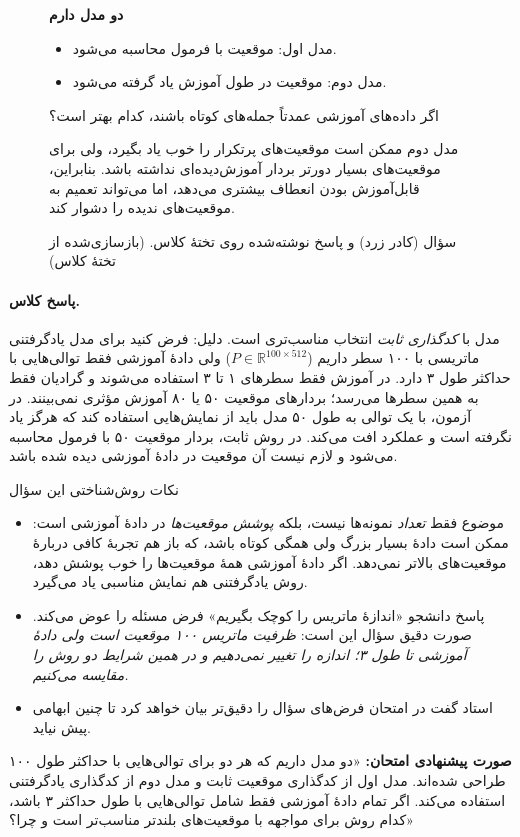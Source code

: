 \begin{figure}[htbp]
\centering
\begin{tcolorbox}[colback=softyellow,colframe=black!70,boxrule=0.8pt,arc=6pt,width=0.9\textwidth]
\textbf{دو مدل دارم}
\begin{itemize}
  \item مدل اول: موقعیت با فرمول محاسبه می‌شود.
  \item مدل دوم: موقعیت در طول آموزش یاد گرفته می‌شود.
\end{itemize}
اگر داده‌های آموزشی عمدتاً جمله‌های کوتاه باشند، کدام بهتر است؟
\end{tcolorbox}
\vspace{4pt}
\begin{tcolorbox}[colback=boxgray,colframe=black!40,boxrule=0.5pt,arc=4pt,width=0.9\textwidth]
مدل دوم ممکن است موقعیت‌های پرتکرار را خوب یاد بگیرد، ولی برای موقعیت‌های بسیار دورتر بردار آموزش‌دیده‌ای نداشته باشد. بنابراین، قابل‌آموزش بودن انعطاف بیشتری می‌دهد، اما می‌تواند تعمیم به موقعیت‌های ندیده را دشوار کند.
\end{tcolorbox}
\caption{سؤال (کادر زرد) و پاسخ نوشته‌شده روی تختهٔ کلاس. (بازسازی‌شده از تختهٔ کلاس)}
\end{figure}

\paragraph{پاسخ کلاس.} مدل با \emph{کدگذاری ثابت} انتخاب مناسب‌تری است. دلیل: فرض کنید برای مدل یادگرفتنی ماتریسی با ۱۰۰ سطر داریم ($P\in\mathbb{R}^{100\times 512}$) ولی دادهٔ آموزشی فقط توالی‌هایی با حداکثر طول ۳ دارد. در آموزش فقط سطرهای ۱ تا ۳ استفاده می‌شوند و گرادیان فقط به همین سطرها می‌رسد؛ بردارهای موقعیت ۵۰ یا ۸۰ آموزش مؤثری نمی‌بینند. در آزمون، با یک توالی به طول ۵۰ مدل باید از نمایش‌هایی استفاده کند که هرگز یاد نگرفته است و عملکرد افت می‌کند. در روش ثابت، بردار موقعیت ۵۰ با فرمول محاسبه می‌شود و لازم نیست آن موقعیت در دادهٔ آموزشی دیده شده باشد.

\begin{exambox}{نکات روش‌شناختی این سؤال}
\begin{itemize}
  \item موضوع فقط \emph{تعداد} نمونه‌ها نیست، بلکه \emph{پوشش موقعیت‌ها} در دادهٔ آموزشی است: ممکن است دادهٔ بسیار بزرگ ولی همگی کوتاه باشد، که باز هم تجربهٔ کافی دربارهٔ موقعیت‌های بالاتر نمی‌دهد. اگر دادهٔ آموزشی همهٔ موقعیت‌ها را خوب پوشش دهد، روش یادگرفتنی هم نمایش مناسبی یاد می‌گیرد.
  \item پاسخ دانشجو «اندازهٔ ماتریس را کوچک بگیریم» فرض مسئله را عوض می‌کند. صورت دقیق سؤال این است: \emph{ظرفیت ماتریس ۱۰۰ موقعیت است ولی دادهٔ آموزشی تا طول ۳؛ اندازه را تغییر نمی‌دهیم و در همین شرایط دو روش را مقایسه می‌کنیم.}
  \item استاد گفت در امتحان فرض‌های سؤال را دقیق‌تر بیان خواهد کرد تا چنین ابهامی پیش نیاید.
\end{itemize}
\textbf{صورت پیشنهادی امتحان:} «دو مدل داریم که هر دو برای توالی‌هایی با حداکثر طول ۱۰۰ طراحی شده‌اند. مدل اول از کدگذاری موقعیت ثابت و مدل دوم از کدگذاری یادگرفتنی استفاده می‌کند. اگر تمام دادهٔ آموزشی فقط شامل توالی‌هایی با طول حداکثر ۳ باشد، کدام روش برای مواجهه با موقعیت‌های بلندتر مناسب‌تر است و چرا؟»
\end{exambox}

